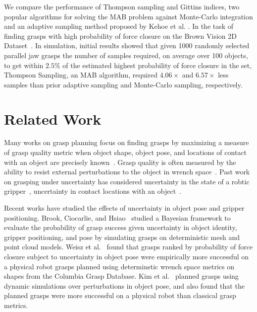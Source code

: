 \documentclass[a4paper, 10pt, conference]{ieeeconf}      %
\begin{document}
We compare the performance of Thompson sampling and Gittins indices, two popular algorithms for solving the MAB problem against Monte-Carlo integration and an adaptive sampling method proposed by Kehoe et al. \cite{kehoe2012toward}. In the task of finding grasps with high probability of force closure on the Brown Vision 2D Dataset~\cite{brown, christopoulos2007handling}.
In simulation, initial results  showed that given 1000 randomly selected parallel jaw grasps the number of samples required, on average over 100 objects, to get within $2.5\%$ of the estimated highest probability of force closure in the set, Thompson Sampling, an MAB algorithm, required $4.06\times$ and $6.57\times$ less samples than prior adaptive sampling and Monte-Carlo sampling, respectively. 


\section{Related Work}

Many works on grasp planning focus on finding grasps by maximizing a measure of grasp quality metric when object shape, object pose, and locations of contact with an object are precisely known~\cite{cheong2011output, ciocarlie2007dimensionality}.
Grasp quality is often measured by the ability to resist external perturbations to the object in wrench space~\cite{ferrari1992planning, miller2004graspit}.
Past work on grasping under uncertainty has considered uncertainty in the state of a robtic gripper~\cite{goldberg1990bayesian, stulp2011learning}, uncertainty in contact locations with an object~\cite{zheng2005}.

Recent works have studied the effects of uncertainty in object pose and gripper positioning.%
Brook, Ciocarlie, and Hsiao~\cite{brook2011collaborative, hsiao2011bayesian} studied a Bayesian framework to evaluate the probability of grasp success given uncertainty in object identity, gripper positioning, and pose by simulating grasps on deterministic mesh and point cloud models.
Weisz et al.~\cite{weisz2012pose} found that grasps ranked by probability of force closure subject to uncertainty in object pose were empirically more successful on a physical robot grasps planned using determinstic wrench space metrics on shapes from the Columbia Grasp Database.
Kim et al.~\cite{kim2012physically} planned grasps using dynamic simulations over perturbations in object pose, and also found that the planned grasps were more successful on a physical robot than classical grasp metrics.
\end{document}
